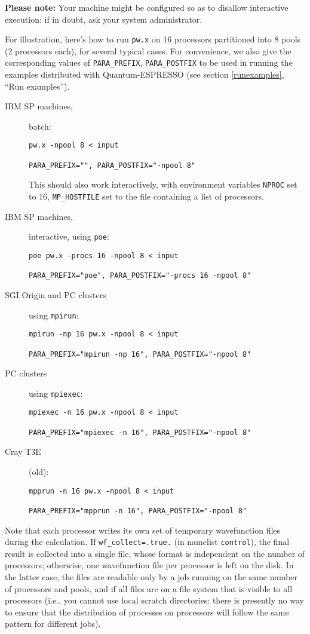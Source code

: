 \documentclass[12pt,a4paper]{article}
\begin{document}
\textbf{Please note:}
Your machine might be configured so as to disallow interactive
execution: if in doubt, ask your system administrator.
\bigskip

For illustration, here's how to run \texttt{pw.x} on 16 processors
partitioned into 8 pools (2 processors each), for several typical
cases.
For convenience, we also give the corresponding values of
\texttt{PARA\_PREFIX}, \texttt{PARA\_POSTFIX} to be used in running
the examples distributed with Quantum-ESPRESSO (see section \ref{runexamples},
``Run examples'').

\begin{description}
  \item [IBM SP machines,] batch:
\begin{verbatim}
pw.x -npool 8 < input

PARA_PREFIX="", PARA_POSTFIX="-npool 8"
\end{verbatim}
    This should also work interactively, with environment variables
    \texttt{NPROC} set to 16, \texttt{MP\_HOSTFILE} set to the file
    containing a list of processors.
  \item [IBM SP machines,] interactive, using \texttt{poe}:
\begin{verbatim}
poe pw.x -procs 16 -npool 8 < input

PARA_PREFIX="poe", PARA_POSTFIX="-procs 16 -npool 8"
\end{verbatim}
  \item [SGI Origin and PC clusters] using \texttt{mpirun}:
\begin{verbatim}
mpirun -np 16 pw.x -npool 8 < input

PARA_PREFIX="mpirun -np 16", PARA_POSTFIX="-npool 8"
\end{verbatim}
  \item [PC clusters] using \texttt{mpiexec}:
\begin{verbatim}
mpiexec -n 16 pw.x -npool 8 < input

PARA_PREFIX="mpiexec -n 16", PARA_POSTFIX="-npool 8"
\end{verbatim}
  \item [Cray T3E] (old):
\begin{verbatim}
mpprun -n 16 pw.x -npool 8 < input

PARA_PREFIX="mpprun -n 16", PARA_POSTFIX="-npool 8"
\end{verbatim}
\end{description}

Note that each processor writes its own set of temporary wavefunction
files during the calculation.
If \texttt{wf\_collect=.true.} (in namelist \texttt{control}), the
final result is collected into a single file, whose format is
independent on the number of processors; otherwise, one wavefunction
file per processor is left on the disk.
In the latter case, the files are readable only by a job running on
the same number of processors and pools, and if all files are on a
file system that is visible to all processors (i.e., you cannot use
local scratch directories: there is presently no way to ensure that
the distribution of processes on processors will follow the same
pattern for different jobs).
\end{document}
